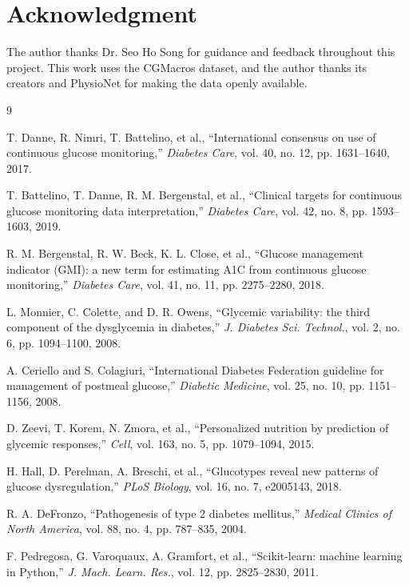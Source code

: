 \documentclass[10pt,conference,compsoc]{IEEEtran}
\begin{document}
\section*{Acknowledgment}
The author thanks Dr. Seo Ho Song for guidance and feedback throughout this
project. This work uses the CGMacros dataset, and the author thanks its creators
and PhysioNet for making the data openly available.

\balance

\begin{thebibliography}{9}

T. Danne, R. Nimri, T. Battelino, et al., ``International consensus on use
of continuous glucose monitoring,'' \emph{Diabetes Care}, vol. 40, no. 12,
pp. 1631--1640, 2017.

T. Battelino, T. Danne, R. M. Bergenstal, et al., ``Clinical targets for
continuous glucose monitoring data interpretation,'' \emph{Diabetes Care},
vol. 42, no. 8, pp. 1593--1603, 2019.

R. M. Bergenstal, R. W. Beck, K. L. Close, et al., ``Glucose management
indicator (GMI): a new term for estimating A1C from continuous glucose
monitoring,'' \emph{Diabetes Care}, vol. 41, no. 11, pp. 2275--2280, 2018.

L. Monnier, C. Colette, and D. R. Owens, ``Glycemic variability: the third
component of the dysglycemia in diabetes,'' \emph{J. Diabetes Sci. Technol.},
vol. 2, no. 6, pp. 1094--1100, 2008.

A. Ceriello and S. Colagiuri, ``International Diabetes Federation guideline for
management of postmeal glucose,'' \emph{Diabetic Medicine}, vol. 25, no. 10,
pp. 1151--1156, 2008.

D. Zeevi, T. Korem, N. Zmora, et al., ``Personalized nutrition by
prediction of glycemic responses,'' \emph{Cell}, vol. 163, no. 5,
pp. 1079--1094, 2015.

H. Hall, D. Perelman, A. Breschi, et al., ``Glucotypes reveal new patterns
of glucose dysregulation,'' \emph{PLoS Biology}, vol. 16, no. 7, e2005143, 2018.

R. A. DeFronzo, ``Pathogenesis of type 2 diabetes mellitus,'' \emph{Medical
Clinics of North America}, vol. 88, no. 4, pp. 787--835, 2004.

F. Pedregosa, G. Varoquaux, A. Gramfort, et al., ``Scikit-learn: machine
learning in Python,'' \emph{J. Mach. Learn. Res.}, vol. 12, pp. 2825--2830, 2011.

\end{thebibliography}
\end{document}

